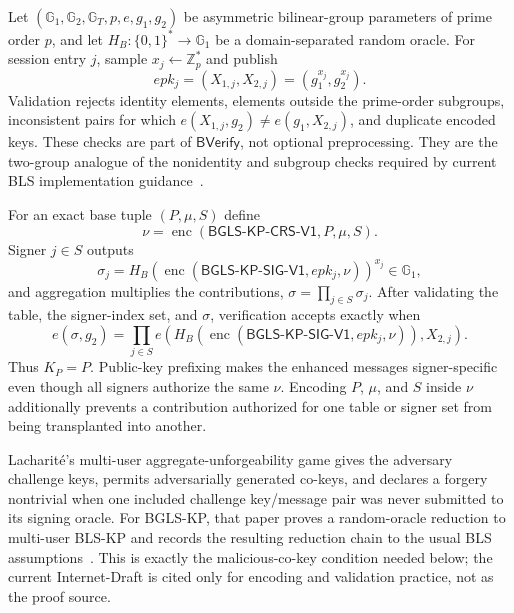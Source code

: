 \documentclass[11pt]{article}
\theoremstyle{definition}
\newcommand{\enc}{\operatorname{enc}}
\begin{document}
Let $(\mathbb G_1,\mathbb G_2,\mathbb G_T,p,e,g_1,g_2)$ be asymmetric bilinear-group parameters of prime order $p$, and let $H_B:\{0,1\}^*\rightarrow\mathbb G_1$ be a domain-separated random oracle.  For session entry $j$, sample $x_j\leftarrow\mathbb Z_p^*$ and publish
\[
 epk_j=(X_{1,j},X_{2,j})=(g_1^{x_j},g_2^{x_j}).
\]
Validation rejects identity elements, elements outside the prime-order subgroups, inconsistent pairs for which
$e(X_{1,j},g_2)\neq e(g_1,X_{2,j})$, and duplicate encoded keys.  These checks are part of $\mathsf{BVerify}$, not optional preprocessing.  They are the two-group analogue of the nonidentity and subgroup checks required by current BLS implementation guidance~\cite{boneh2026blsdraft}.

For an exact base tuple $(P,\mu,S)$ define
\begin{equation}
 \nu=\enc(\mathsf{BGLS\mbox{-}KP\mbox{-}CRS\mbox{-}V1},P,\mu,S).
 \label{eq:bgls-message}
\end{equation}
Signer $j\in S$ outputs
\[
 \sigma_j=H_B(\enc(\mathsf{BGLS\mbox{-}KP\mbox{-}SIG\mbox{-}V1},epk_j,\nu))^{x_j}\in\mathbb G_1,
\]
and aggregation multiplies the contributions, $\sigma=\prod_{j\in S}\sigma_j$.  After validating the table, the signer-index set, and $\sigma$, verification accepts exactly when
\begin{equation}
 e(\sigma,g_2)=\prod_{j\in S}
 e\!\left(H_B(\enc(\mathsf{BGLS\mbox{-}KP\mbox{-}SIG\mbox{-}V1},epk_j,\nu)),X_{2,j}\right).
 \label{eq:bgls-verify}
\end{equation}
Thus $K_P=P$.  Public-key prefixing makes the enhanced messages signer-specific even though all signers authorize the same $\nu$.  Encoding $P$, $\mu$, and $S$ inside $\nu$ additionally prevents a contribution authorized for one table or signer set from being transplanted into another.

Lacharit\'e's multi-user aggregate-unforgeability game gives the adversary challenge keys, permits adversarially generated co-keys, and declares a forgery nontrivial when one included challenge key/message pair was never submitted to its signing oracle.  For BGLS-KP, that paper proves a random-oracle reduction to multi-user BLS-KP and records the resulting reduction chain to the usual BLS assumptions~\cite{lacharite2018multiuser}.  This is exactly the malicious-co-key condition needed below; the current Internet-Draft is cited only for encoding and validation practice, not as the proof source.
\end{document}
